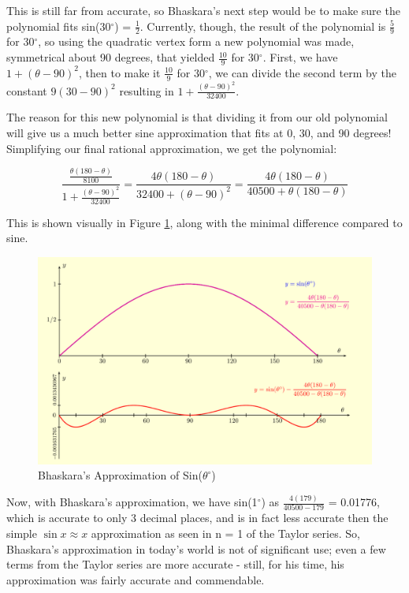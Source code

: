 \documentclass[12pt]{article}
\begin{document}
This is still far from accurate, so Bhaskara's next step would be to make sure the polynomial fits sin(30$^\circ$) = $\frac{1}{2}$. Currently, though, the result of the polynomial is $\frac{5}{9}$ for 30$^\circ$, so using the quadratic vertex form a new polynomial was made, symmetrical about 90 degrees, that yielded $\frac{10}{9}$ for 30$^\circ$. First, we have $1 +(\theta - 90)^2$, then to make it $\frac{10}{9}$ for 30$^\circ$, we can divide the second term by the constant $9(30-90)^2$ resulting in $1 +\frac{(\theta - 90)^2}{32400}$. 

The reason for this new polynomial is that dividing it from our old polynomial will give us a much better sine approximation that fits at 0, 30, and 90 degrees! Simplifying our final rational approximation, we get the polynomial:

\[
\frac{\frac{\theta(180-\theta)}{8100}}{1 +\frac{(\theta - 90)^2}{32400}} = \frac{4\theta(180-\theta)}{32400+(\theta - 90)^2} = \frac{4\theta(180-\theta)}{40500+\theta(180-\theta)}
\]

This is shown visually in Figure \ref{fig:sindegA2}, along with the minimal difference compared to sine.

\begin{figure}[h]
    \centering
    \includegraphics[width=0.7\linewidth]{bhaskara-final.png}
    \caption{Bhaskara's Approximation of Sin($\theta^{\circ}$)}
    \label{fig:sindegA2}
\end{figure}  

Now, with Bhaskara's approximation, we have sin(1$^{\circ}$) as $\frac{4(179)}{40500-179}$ = 0.01776, which is accurate to only 3 decimal places, and is in fact less accurate then the simple $\sin x \approx x$ approximation as seen in n = 1 of the Taylor series. So, Bhaskara's approximation in today's world is not of significant use; even a few terms from the Taylor series are more accurate - still, for his time, his approximation was fairly accurate and commendable.
\end{document}
